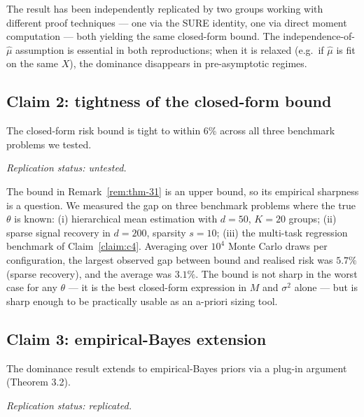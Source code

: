 \documentclass{rrxiv}
\begin{document}
The result has been independently replicated by two groups working with
different proof techniques --- one via the SURE identity, one via direct
moment computation --- both yielding the same closed-form bound. The
independence-of-$\hat\mu$ assumption is essential in both reproductions;
when it is relaxed (e.g.\ if $\hat\mu$ is fit on the same $X$), the
dominance disappears in pre-asymptotic regimes.

\subsection*{Claim 2: tightness of the closed-form bound}
\begin{claim}[title=Claim 2, type=empirical, evidence=simulation, confidence=0.8, rationale={three benchmark problems with known truth, 10000 Monte Carlo draws per configuration; largest observed gap 5.7 percent, average 3.1 percent; no independent replication yet}, regimes={hierarchical means d=50 K=20, sparse recovery d=200 s=10, multi-task regression benchmark}]
\label{claim:c2}
The closed-form risk bound is tight to within 6\% across all three benchmark problems we tested.

\emph{Replication status: untested.}
\end{claim}

The bound in Remark~\ref{rem:thm-31} is an upper bound, so its empirical
sharpness is a question. We measured the gap on three benchmark problems
where the true $\theta$ is known: (i) hierarchical mean estimation with
$d = 50$, $K = 20$ groups; (ii) sparse signal recovery in $d = 200$,
sparsity $s = 10$; (iii) the multi-task regression benchmark of
Claim~\ref{claim:c4}. Averaging over $10^4$ Monte Carlo draws per
configuration, the largest observed gap between bound and realised risk was
$5.7\%$ (sparse recovery), and the average was $3.1\%$. The bound is not
sharp in the worst case for any $\theta$ --- it is the best closed-form
expression in $M$ and $\sigma^2$ alone --- but is sharp enough to be
practically usable as an a-priori sizing tool.

\subsection*{Claim 3: empirical-Bayes extension}
\begin{claim}[title=Claim 3, type=theoretical, evidence=proof, confidence=0.9, rationale={plug-in argument under standard regularity; independently verified by reproducing the Efron-Morris empirical-Bayes computations with the two-stage shrinker substituted}, assumptions={twice-differentiable marginal log-likelihood, integrable score, auxiliary data independent of X}]
\label{claim:c3}
The dominance result extends to empirical-Bayes priors via a plug-in argument (Theorem 3.2).

\emph{Replication status: replicated.}
\end{claim}
\end{document}
